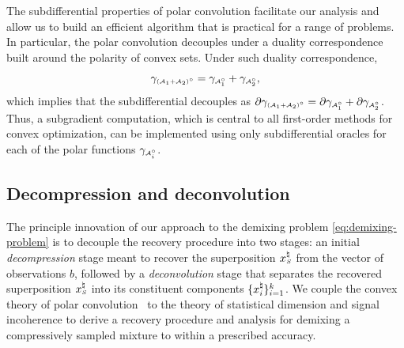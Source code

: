The subdifferential properties of polar convolution facilitate our analysis and allow us to build an efficient algorithm that is practical for a range of problems. In particular, the polar convolution decouples under a duality correspondence built around the polarity of convex sets. Under such duality correspondence,
\[
  \gamma_{\scriptscriptstyle(\mathcal{A}_1+\mathcal{A}_2)^\circ}
  = \gamma_{\scriptscriptstyle\mathcal{A}_1^\circ} + \gamma_{\scriptscriptstyle\mathcal{A}_2^\circ},
\]
which implies that the subdifferential decouples as 
$\partial \gamma_{\scriptscriptstyle(\mathcal{A}_1+\mathcal{A}_2)^\circ} = \partial\gamma_{\scriptscriptstyle\mathcal{A}_1^\circ}+\partial\gamma_{\scriptscriptstyle\mathcal{A}_2^\circ}$. Thus, a subgradient computation, which is central to all first-order methods for convex optimization, can be implemented using only subdifferential oracles for each of the polar functions $\gamma_{\scriptscriptstyle\mathcal{A}_i^\circ}$. 

\subsection{Decompression and deconvolution} \label{sec:3-1-2}

The principle innovation of our approach to the demixing problem \eqref{eq:demixing-problem} is to decouple the recovery procedure into two stages: an initial \emph{decompression} stage meant to recover the superposition $x_{\scriptscriptstyle S}^\natural$ from the vector of observations $b$, followed by a \emph{deconvolution} stage that separates the recovered superposition $x_{\scriptscriptstyle S}^\natural$ into its constituent components $\{x_i^{\natural}\}_{i=1}^k$. We couple the convex theory of polar convolution~\citep{friedlander2019polarconvolution} to the theory of statistical dimension and signal incoherence to derive a recovery procedure and analysis for demixing a compressively sampled mixture to within a prescribed accuracy.

